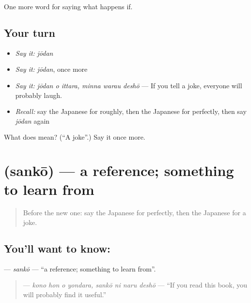 \begin{grammarlens}[title={What you've built}]
One more word for saying what happens if.
\end{grammarlens}

\subsection*{Your turn}
\begin{itemize}
\raggedright
  \item \emph{Say it:} \emph{jōdan}
  \item \emph{Say it:} \emph{jōdan}, once more
  \item \emph{Say it:} \emph{jōdan o ittara, minna warau deshō} — If you tell a joke, everyone will probably laugh.
  \item \emph{Recall:} say the Japanese for roughly, then the Japanese for perfectly, then say \emph{jōdan} again
\end{itemize}

\begin{tcolorbox}[breakable,colback=teal!4,colframe=teal!35!black,title={Before you move on}]
What does  mean? (\textquotedblleft{}A joke\textquotedblright{}.) Say it once more.
\end{tcolorbox}
\section[\texorpdfstring{\ja{さんこう} (sankō)}{さんこう (sankō)}]{ (sankō) — a reference; something to learn from}

\label{lesson:JA-C371-sankou}



\begin{quote}
Before the new one: say the Japanese for perfectly, then the Japanese for a joke.
\end{quote}

\subsection*{You'll want to know: }
\textbf{} — \emph{sankō} — \textquotedblleft{}a reference; something to learn from\textquotedblright{}.

\begin{quote}
\textbf{   } — \emph{kono hon o yondara, sankō ni naru deshō} — \textquotedblleft{}If you read this book, you will probably find it useful.\textquotedblright{}
\end{quote}

